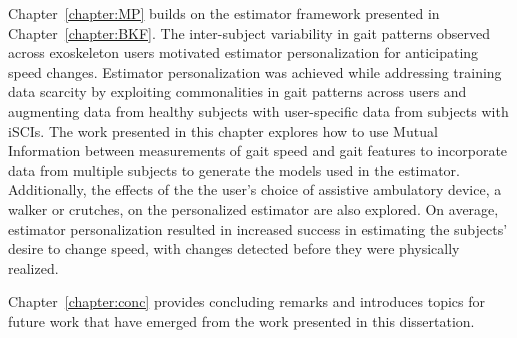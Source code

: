 Chapter~\ref{chapter:MP} builds on the estimator framework presented in Chapter~\ref{chapter:BKF}. The inter-subject variability in gait patterns observed across exoskeleton users motivated estimator personalization for anticipating speed changes. Estimator personalization was achieved while addressing training data scarcity by exploiting commonalities in gait patterns across users and augmenting data from healthy subjects with user-specific data from subjects with iSCIs. The work presented in this chapter explores how to use Mutual Information between measurements of gait speed and gait features to incorporate data from multiple subjects to generate the models used in the estimator. Additionally, the effects of the the user's choice of assistive ambulatory device, a walker or crutches, on the personalized estimator are also explored. On average, estimator personalization resulted in increased success in estimating the subjects' desire to change speed, with changes detected before they were physically realized.

Chapter~\ref{chapter:conc} provides concluding remarks and introduces topics for future work that have emerged from the work presented in this dissertation.


